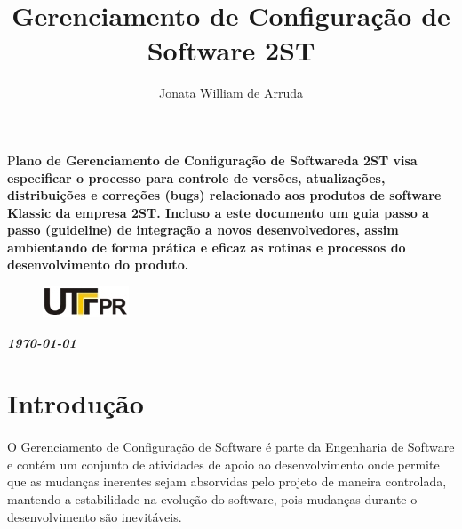 \documentclass[	DIV=calc,%
							paper=a4,%
							fontsize=12pt,%
							onecolumn]{scrartcl}	 					%
\title{Gerenciamento de Configuração de Software 2ST }					%
\author{Jonata William de Arruda}  	%
\date{}																				%
\newcommand{\initial}[1]{%
     \lettrine[lines=3,lhang=0.3,nindent=0em]{
     				\color{DarkGoldenrod}
     				{\textsf{#1}}}{}}
\begin{document}
\maketitle
\thispagestyle{fancy} 	
\thispagestyle{empty}		%




\initial{P}\textbf{lano de Gerenciamento de Configuração de Softwareda 2ST visa especificar o processo para controle de versões, atualizações, distribuições e correções (bugs) relacionado aos produtos de software Klassic da empresa 2ST. Incluso a este documento um guia passo a passo (guideline) de integração a novos desenvolvedores, assim ambientando de forma prática e eficaz as rotinas e processos do desenvolvimento do produto.}

\begin{figure}
	\centering
	\includegraphics{utfpr}
\end{figure}

\vspace{3cm}
\centerline{\textit{\textbf{\today}}}

\clearpage
    \renewcommand*\listfigurename{Lista de figuras}
\listoffigures

\renewcommand*\listtablename{Lista de tabelas}
\listoftables




\clearpage
\renewcommand{\contentsname}{Sumário}
\tableofcontents
\clearpage

\section{Introdução}
\paragraph{}
O Gerenciamento de Configuração de Software é parte da Engenharia de Software e contém um conjunto de atividades de apoio ao desenvolvimento onde permite que as mudanças inerentes sejam absorvidas pelo projeto de maneira controlada, mantendo a estabilidade na evolução do software, pois mudanças durante o desenvolvimento são inevitáveis.
\end{document}
